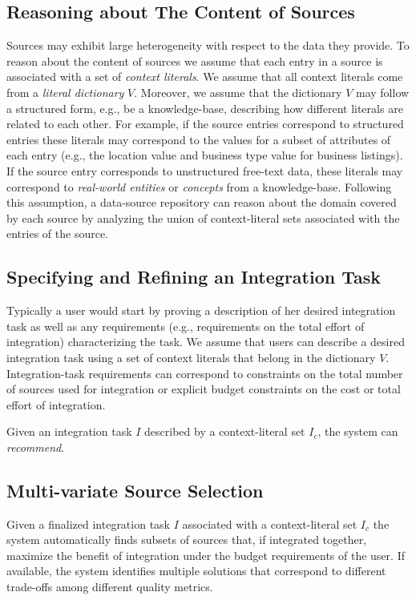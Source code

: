 \documentclass{vldb}
\begin{document}
\subsection{Reasoning about The Content of Sources}
\label{sec:reasoning}
Sources may exhibit large heterogeneity with respect to the data they provide. To reason about the content of sources we assume that each entry in a source is associated with a set of {\em context literals}. We assume that all context literals come from a {\em literal dictionary} $V$. Moreover, we assume that the dictionary $V$ may follow a structured form, e.g., be a knowledge-base, describing how different literals are related to each other. For example, if the source entries correspond to structured entries these literals may correspond to the values for a subset of attributes of each entry (e.g., the location value and business type value for business listings). If the source entry corresponds to unstructured free-text data, these literals may correspond to {\em real-world entities} or {\em concepts} from a knowledge-base. Following this assumption, a data-source repository can reason about the domain covered by each source by analyzing the union of context-literal sets associated with the entries of the source. 

\subsection{Specifying and Refining an Integration Task}
\label{sec:integtask}
Typically a user would start by proving a description of her desired integration task as well as any requirements (e.g., requirements on the total effort of integration) characterizing the task. We assume that users can describe a desired integration task using a set of context literals that belong in the dictionary $V$. Integration-task requirements can correspond to constraints on the total number of sources used for integration or explicit budget constraints on the cost or total effort of integration.

Given an integration task $I$ described by a  context-literal set $I_c$, the system can {\em recommend}.


\subsection{Multi-variate Source Selection}
\label{sec:sourcesel}
Given a finalized integration task $I$ associated with a context-literal set $I_c$ the system automatically finds subsets of sources that, if integrated together, maximize the benefit of integration under the budget requirements of the user. If available, the system identifies multiple solutions that correspond to different trade-offs among different quality metrics.
\end{document}

